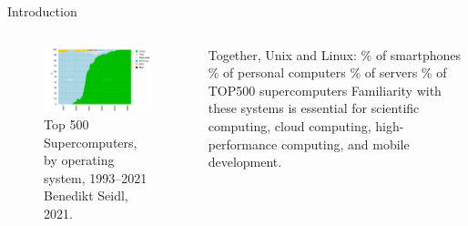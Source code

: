 \documentclass[aspectratio=169]{beamer}
\begin{document}
    \begin{frame}{Introduction}
        \begin{columns}
            \begin{column}{0.5\linewidth}
                \begin{figure}[H]
                    \centering
                    \includegraphics[width=\linewidth]{top500.png}
                    \caption{Top 500 Supercomputers, by operating system, 1993--2021 \ccPublicDomain Benedikt Seidl, 2021.}
                \end{figure}
            \end{column}
            \begin{column}{0.5\linewidth}
                \begin{outline}
                \1 Together, Unix and Linux:
                    \% of smartphones
                    \% of personal computers
                    \% of servers
                    \% of TOP500 supercomputers
                \1 Familiarity with these systems is essential for scientific computing, cloud computing, high-performance computing, and mobile development.
            \end{outline}
            \end{column}
        \end{columns}
    \end{frame}
\end{document}
